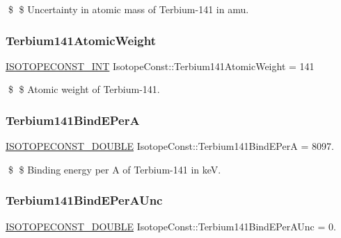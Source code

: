 \$ \$ Uncertainty in atomic mass of Terbium-\/141 in amu. \mbox{\label{group___isotope_const-_terbium-_tb141_ga27b17b9c836739e4ce11c4e736322fbd}} 
\subsubsection{\texorpdfstring{Terbium141\+Atomic\+Weight}{Terbium141AtomicWeight}}
{\footnotesize\ttfamily \mbox{\hyperlink{group___isotope_const-_macros_ga5f18360b3e99483a35c32d789e62621c}{I\+S\+O\+T\+O\+P\+E\+C\+O\+N\+S\+T\+\_\+\+I\+NT}} Isotope\+Const\+::\+Terbium141\+Atomic\+Weight = 141}

\$ \$ Atomic weight of Terbium-\/141. \mbox{\label{group___isotope_const-_terbium-_tb141_ga3621d5b0a4b19a956bd3a509378687c8}} 
\subsubsection{\texorpdfstring{Terbium141\+Bind\+E\+PerA}{Terbium141BindEPerA}}
{\footnotesize\ttfamily \mbox{\hyperlink{group___isotope_const-_macros_ga8f45a7272ce02c0b4c65c44636ed719a}{I\+S\+O\+T\+O\+P\+E\+C\+O\+N\+S\+T\+\_\+\+D\+O\+U\+B\+LE}} Isotope\+Const\+::\+Terbium141\+Bind\+E\+PerA = 8097.}

\$ \$ Binding energy per A of Terbium-\/141 in keV. \mbox{\label{group___isotope_const-_terbium-_tb141_gaa2d5f8db5725ea6501514c5186809a69}} 
\subsubsection{\texorpdfstring{Terbium141\+Bind\+E\+Per\+A\+Unc}{Terbium141BindEPerAUnc}}
{\footnotesize\ttfamily \mbox{\hyperlink{group___isotope_const-_macros_ga8f45a7272ce02c0b4c65c44636ed719a}{I\+S\+O\+T\+O\+P\+E\+C\+O\+N\+S\+T\+\_\+\+D\+O\+U\+B\+LE}} Isotope\+Const\+::\+Terbium141\+Bind\+E\+Per\+A\+Unc = 0.}

